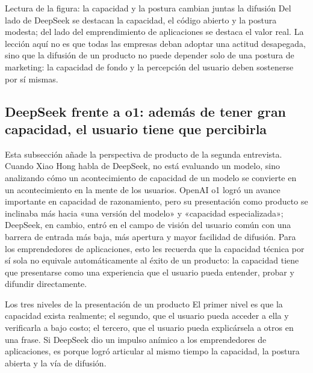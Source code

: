 \documentclass[a4paper]{article}
\begin{document}
\begin{knowledgebox}{Lectura de la figura: la capacidad y la postura cambian juntas la difusión}
Del lado de DeepSeek se destacan la capacidad, el código abierto y la postura modesta; del lado del emprendimiento de aplicaciones se destaca el valor real. La lección aquí no es que todas las empresas deban adoptar una actitud desapegada, sino que la difusión de un producto no puede depender solo de una postura de marketing: la capacidad de fondo y la percepción del usuario deben sostenerse por sí mismas.
\end{knowledgebox}

\subsection{DeepSeek frente a o1: además de tener gran capacidad, el usuario tiene que percibirla}

Esta subsección añade la perspectiva de producto de la segunda entrevista. Cuando Xiao Hong habla de DeepSeek, no está evaluando un modelo, sino analizando cómo un acontecimiento de capacidad de un modelo se convierte en un acontecimiento en la mente de los usuarios. OpenAI o1 logró un avance importante en capacidad de razonamiento, pero su presentación como producto se inclinaba más hacia «una versión del modelo» y «capacidad especializada»; DeepSeek, en cambio, entró en el campo de visión del usuario común con una barrera de entrada más baja, más apertura y mayor facilidad de difusión. Para los emprendedores de aplicaciones, esto les recuerda que la capacidad técnica por sí sola no equivale automáticamente al éxito de un producto: la capacidad tiene que presentarse como una experiencia que el usuario pueda entender, probar y difundir directamente.

\begin{importantbox}{Los tres niveles de la presentación de un producto}
El primer nivel es que la capacidad exista realmente; el segundo, que el usuario pueda acceder a ella y verificarla a bajo costo; el tercero, que el usuario pueda explicársela a otros en una frase. Si DeepSeek dio un impulso anímico a los emprendedores de aplicaciones, es porque logró articular al mismo tiempo la capacidad, la postura abierta y la vía de difusión.
\end{importantbox}
\end{document}
